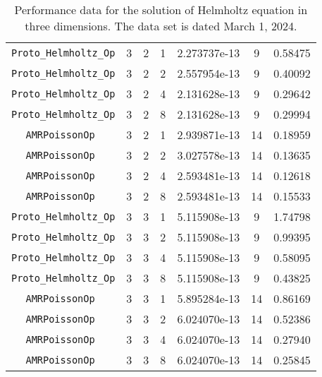 \documentclass{article}
\begin{document}
\begin{small}
\begin{table}
\begin{center}
\begin{tabular}{|c|c|c|c|c|c||c|}
\hline                                                                               
 {\tt Proto\_Helmholtz\_Op} & 3 & 2   & 1    & 2.273737e-13   &   9   &  0.58475   \\
 {\tt Proto\_Helmholtz\_Op} & 3 & 2   & 2    & 2.557954e-13   &   9   &  0.40092   \\
 {\tt Proto\_Helmholtz\_Op} & 3 & 2   & 4    & 2.131628e-13   &   9   &  0.29642   \\
 {\tt Proto\_Helmholtz\_Op} & 3 & 2   & 8    & 2.131628e-13   &   9   &  0.29994   \\
\hline                                                                               
 {\tt AMRPoissonOp        } & 3 & 2   & 1    & 2.939871e-13   &   14   &  0.18959  \\
 {\tt AMRPoissonOp        } & 3 & 2   & 2    & 3.027578e-13   &   14   &  0.13635  \\
 {\tt AMRPoissonOp        } & 3 & 2   & 4    & 2.593481e-13   &   14   &  0.12618  \\
 {\tt AMRPoissonOp        } & 3 & 2   & 8    & 2.593481e-13   &   14   &  0.15533  \\
 \hline                                                                               
 {\tt Proto\_Helmholtz\_Op} & 3 & 3   & 1    & 5.115908e-13   &   9   &   1.74798  \\
 {\tt Proto\_Helmholtz\_Op} & 3 & 3   & 2    & 5.115908e-13   &   9   &   0.99395  \\
 {\tt Proto\_Helmholtz\_Op} & 3 & 3   & 4    & 5.115908e-13   &   9   &   0.58095  \\
 {\tt Proto\_Helmholtz\_Op} & 3 & 3   & 8    & 5.115908e-13   &   9   &   0.43825  \\
\hline                                                                               
 {\tt AMRPoissonOp        } & 3 & 3   & 1    & 5.895284e-13   &  14    & 0.86169   \\
 {\tt AMRPoissonOp        } & 3 & 3   & 2    & 6.024070e-13   &  14    & 0.52386   \\
 {\tt AMRPoissonOp        } & 3 & 3   & 4    & 6.024070e-13   &  14    & 0.27940   \\
 {\tt AMRPoissonOp        } & 3 & 3   & 8    & 6.024070e-13   &  14    & 0.25845   \\
 \hline
\end{tabular}
\end{center}
\label{tab::2}
\caption
    {
      Performance data for the solution of Helmholtz
      equation in three dimensions.
      The data set is dated March 1, 2024.
    }
\end{table}
\end{small}
\end{document}
